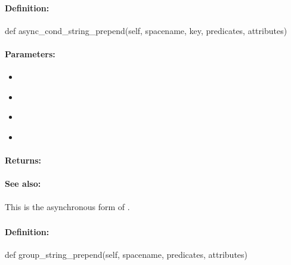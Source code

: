 \paragraph{Definition:}
\begin{pythoncode}
def async_cond_string_prepend(self, spacename, key, predicates, attributes)
\end{pythoncode}

\paragraph{Parameters:}
\begin{itemize}[noitemsep]
\item {}\\

\item {}\\

\item {}\\

\item {}\\

\end{itemize}

\paragraph{Returns:}


\paragraph{See also:}  This is the asynchronous form of .

\pagebreak
\subsubsection{}
\label{api:python:group_string_prepend}


\paragraph{Definition:}
\begin{pythoncode}
def group_string_prepend(self, spacename, predicates, attributes)
\end{pythoncode}

